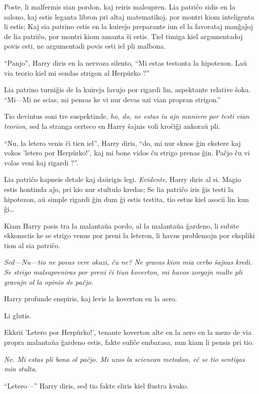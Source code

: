 Poste, li malfermis sian pordon, kaj reiris malsupren. Lia patriĉo
sidis en la salono, kaj estis leganta libron pri altaj matematikoj,
por montri kiom inteligenta li estis; Kaj sia patrino estis en la
kuirejo preparante iun el la favorataj manĝaĵoj de lia patriĉo, por
montri kiom amanta ŝi estis. Tiel timiga kiel argumentadoj povis esti,
ne argumentadi povis esti iel pli malbona.

``Panjo'', Harry diris en la nervoza silento, ``Mi estas testonta la
hipotezon. Laŭ via teorio kiel mi sendas strigon al Herpŭrko ?''

Lia patrino turniĝis de la kuireja lavujo por rigardi lin, aspektante
relative ŝoka. ``Mi—Mi ne scias, mi pensas ke vi nur devas uzi vian
propran strigon.''

Tio devintus soni tre suspektinde, \emph{ho, do, ne estas iu ajn maniero por
  testi vian teorion}, sed la stranga certeco en Harry ŝajnis voli
kroĉiĝi ankoraŭ pli.

``Nu, la letero venis ĉi tien iel'', Harry diris, ``do, mi nur skuos
ĝin ekstere kaj vokos 'letero por Herpŭrko!', kaj mi bone vidos ĉu
strigo prenas ĝin. Paĉjo ĉu vi volas veni kaj rigardi ?''.

Lia patriĉo kapneis detale kaj daŭrigis legi. \emph{Evidente}, Harry
diris al si. Magio estis hontinda aĵo, pri kio nur stultulo kredas; Se
lia patriĉo iris ĝis testi la hipotezon, aŭ simple rigardi ĝin dum ĝi
estis testita, tio estus kiel asocii lin kun ĝi\ldots

Kiam Harry pasis tra la malantaŭa pordo, al la malantaŭa ĝardeno, li
subite ekkonsciis ke se strigo venus por preni la leteron, li havus
problemojn por ekspliki tion al sia patriĉo.

\emph{Sed—Nu—tio ne povas vere okazi, ĉu ne? Ne gravas kion mia cerbo
  ŝajnas kredi. Se strigo malsupreniras por preni ĉi tiun koverton, mi
  havos zorgojn multe pli gravajn ol la opinio de paĉjo.}

Harry profunde enspiris, kaj levis la koverton en la aero.

Li glutis.

Ekkrii 'Letero por Herpŭrko!', tenante koverton alte en la aero en la
mezo de via propra malantaŭa ĝardeno estis, fakte sufiĉe embarasa,
nun kiam li pensis pri tio.

\emph{Ne. Mi estas pli bona ol paĉjo. Mi uzos la sciencan metodon, eĉ
  se tio sentigas min stulta}.

``Letero—'' Harry diris, sed tio fakte eliris kiel flustra kvako.

